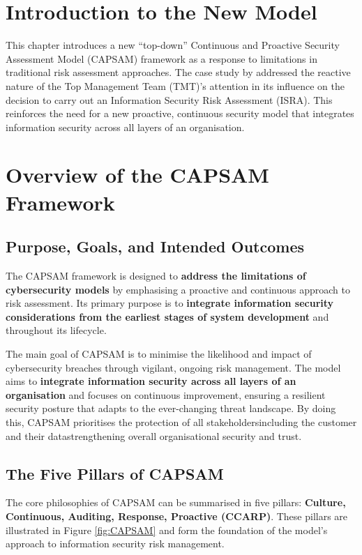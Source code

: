 \section{Introduction to the New Model}
This chapter introduces a new ``top-down'' Continuous and Proactive Security Assessment Model (CAPSAM) framework as a response to limitations in traditional risk assessment approaches. The case study by \citet{shaikh2023information} addressed the reactive nature of the Top Management Team (TMT)'s attention in its influence on the decision to carry out an Information Security Risk Assessment (ISRA). This reinforces the need for a new proactive, continuous security model that integrates information security across all layers of an organisation.

\section{Overview of the CAPSAM Framework}
    \subsection{Purpose, Goals, and Intended Outcomes}
    The CAPSAM framework is designed to \textbf{address the limitations of cybersecurity models} by emphasising a proactive and continuous approach to risk assessment. Its primary purpose is to \textbf{integrate information security considerations from the earliest stages of system development} and throughout its lifecycle.

    The main goal of CAPSAM is to minimise the likelihood and impact of cybersecurity breaches through vigilant, ongoing risk management. The model aims to \textbf{integrate information security across all layers of an organisation} and focuses on continuous improvement, ensuring a resilient security posture that adapts to the ever-changing threat landscape. By doing this, CAPSAM prioritises the protection of all stakeholders\textemdash including the customer and their data\textemdash strengthening overall organisational security and trust.

    \subsection{The Five Pillars of CAPSAM}
    The core philosophies of CAPSAM can be summarised in five pillars: \textbf{Culture, Continuous, Auditing, Response, Proactive (CCARP)}. These pillars are illustrated in Figure \ref{fig:CAPSAM} and form the foundation of the model's approach to information security risk management.

